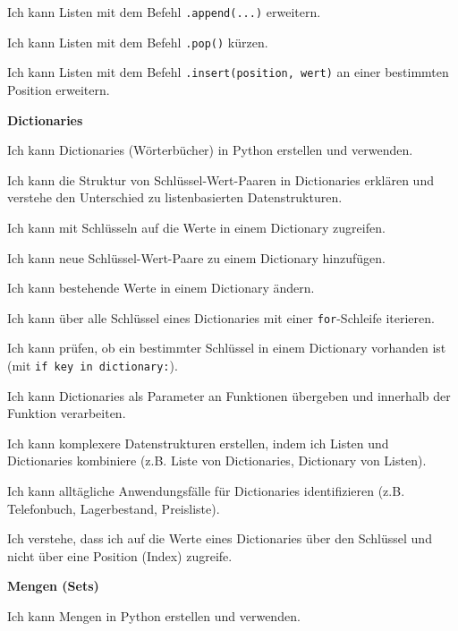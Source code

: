 \begin{todolist}
    \begin{todolist}
        \item Ich kann Listen mit dem Befehl \lstinline|.append(...)| erweitern.
        \item Ich kann Listen mit dem Befehl \lstinline|.pop()| kürzen.
        \item Ich kann Listen mit dem Befehl \lstinline|.insert(position, wert)| an einer bestimmten Position erweitern.
    \end{todolist}
    \item \textbf{Dictionaries}
    \begin{todolist}
        \item Ich kann Dictionaries (Wörterbücher) in Python erstellen und verwenden.
        \item Ich kann die Struktur von Schlüssel-Wert-Paaren in Dictionaries erklären und verstehe den Unterschied zu listenbasierten Datenstrukturen.
        \item Ich kann mit Schlüsseln auf die Werte in einem Dictionary zugreifen.
        \item Ich kann neue Schlüssel-Wert-Paare zu einem Dictionary hinzufügen.
        \item Ich kann bestehende Werte in einem Dictionary ändern.
        \item Ich kann über alle Schlüssel eines Dictionaries mit einer \lstinline|for|-Schleife iterieren.
        \item Ich kann prüfen, ob ein bestimmter Schlüssel in einem Dictionary vorhanden ist (mit \lstinline|if key in dictionary:|).
        \item Ich kann Dictionaries als Parameter an Funktionen übergeben und innerhalb der Funktion verarbeiten.
        \item Ich kann komplexere Datenstrukturen erstellen, indem ich Listen und Dictionaries kombiniere (z.B. Liste von Dictionaries, Dictionary von Listen).
        \item Ich kann alltägliche Anwendungsfälle für Dictionaries identifizieren (z.B. Telefonbuch, Lagerbestand, Preisliste).
        \item Ich verstehe, dass ich auf die Werte eines Dictionaries über den Schlüssel und nicht über eine Position (Index) zugreife.
    \end{todolist}
    \item \textbf{Mengen (Sets)}
    \begin{todolist}
        \item Ich kann Mengen in Python erstellen und verwenden.

\end{todolist}
\end{todolist}
